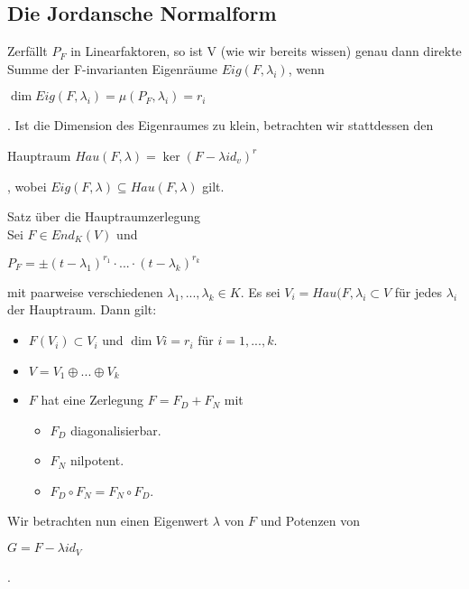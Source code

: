 \subsection{Die Jordansche Normalform}

Zerfällt $P_F$ in Linearfaktoren, so ist V (wie wir bereits wissen) genau dann direkte Summe der F-invarianten Eigenräume $Eig(F, \lambda_i)$, wenn
\begin{center}
$\dim Eig(F, \lambda_i)=\mu(P_F, \lambda_i)=r_i$
\end{center}
. Ist die Dimension des Eigenraumes zu klein, betrachten wir stattdessen den
\begin{definition}
Hauptraum $Hau(F, \lambda)=\ker (F-\lambda id_v)^r$
\end{definition}
, wobei $Eig(F,\lambda) \subseteq Hau(F,\lambda)$ gilt.

\begin{satz}
Satz über die Hauptraumzerlegung \\
Sei $F \in End_K(V)$ und 
\begin{center}
$P_F= \pm (t-\lambda_1)^{r_1} \cdot ... \cdot (t-\lambda_k)^{r_k}$
\end{center}
mit paarweise verschiedenen $\lambda_1 , ... , \lambda_k \in K$. Es sei $V_i = Hau(F, \lambda_i \subset V$ für jedes $\lambda_i$ der Hauptraum. Dann gilt:
\begin{itemize}
\item $F(V_i) \subset V_i$ und $\dim Vi = r_i$ für $i=1, ... , k$.
\item $V= V_1 \oplus ... \oplus V_k$
\item $F$ hat eine Zerlegung $F=F_D + F_N$ mit
\begin{itemize}
\item $F_D$ diagonalisierbar.
\item $F_N$ nilpotent.
\item $F_D \circ F_N = F_N \circ F_D$.
\end{itemize}
\end{itemize}
\end{satz}

Wir betrachten nun einen Eigenwert $\lambda$ von $F$ und Potenzen von 
\begin{center}
$G=F-\lambda id_V$
\end{center}
.

